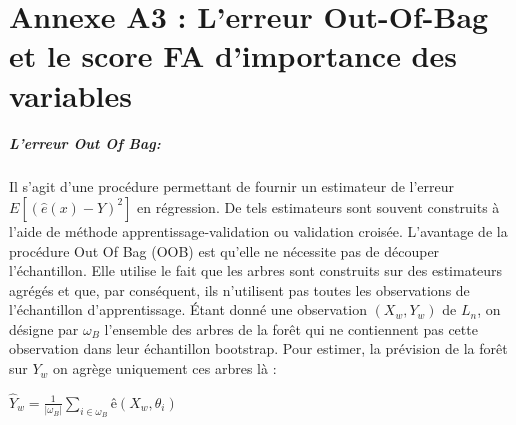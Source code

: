 \chapter*{Annexe A3 : L'erreur Out-Of-Bag et le score FA d'importance des variables}
\paragraph{L'erreur Out Of Bag:}
	Il s'agit d'une procédure permettant de fournir un estimateur de l'erreur ${E[(\hat{e}(x)-Y)^2]}$ en régression. De tels estimateurs sont souvent construits à l'aide de méthode apprentissage-validation ou validation croisée. L'avantage de la procédure Out Of Bag (OOB) est qu'elle ne nécessite pas de découper
	l'échantillon. Elle utilise le fait que les arbres sont construits sur des estimateurs agrégés et que,
	par conséquent, ils n'utilisent pas toutes les observations de l'échantillon d'apprentissage. Étant donné une observation ${(X_w,Y_w)}$ de $L_n$, on désigne par ${\omega_B}$ l'ensemble des arbres de la forêt qui
	ne contiennent pas cette observation dans leur échantillon bootstrap. Pour estimer, la prévision de
	la forêt sur ${Y_w}$ on agrège uniquement ces arbres là :
	\begin{center}
	$\hat{Y}_w = \frac{1}{|\omega_B|} \sum_{i \in \omega_B} ê(X_w,\theta_i)$
	\end{center}

